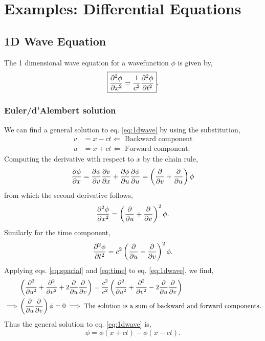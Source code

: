 \documentclass{book}
\begin{document}
\chapter{Examples: Differential Equations}
\section{1D Wave Equation}
The 1 dimensional wave equation for a wavefunction $\phi$ is given by,
\begin{equation}
	\boxed{\pdv[2]{\phi}{x} = \frac{1}{c^2}\pdv[2]{\phi}{t}}. \label{eq:1dwave}
\end{equation}
\subsection{Euler/d'Alembert solution}
We can find a general solution to eq. \eqref{eq:1dwave} by using the substitution,
\begin{align}
	v & = x - ct \Leftarrow \text{ Backward component}\label{eq:backward}\\
	u & = x + ct \Leftarrow \text{ Forward component}\label{eq:forward}.
\end{align}
Computing the derivative with respect to $x$ by the chain rule,
\begin{equation}
	\pdv{\phi}{x} = \pdv{\phi}{v}\pdv{v}{x} + \pdv{\phi}{u}\pdv{\phi}{u} = \left(\pdv{v} + \pdv{u}\right)\phi
\end{equation}
from which the second derivative follows,
\begin{equation}
	\pdv[2]{\phi}{x} = \left(\pdv{u}+\pdv{v}\right)^2\phi. \label{eq:spacial}
\end{equation}
Similarly for the time component,
\begin{equation}
	\pdv[2]{\phi}{t} = c^2\left(\pdv{u}-\pdv{v}\right)^2\phi. \label{eq:time}
\end{equation}
Applying eqs. \eqref{eq:spacial} and \eqref{eq:time} to eq. \eqref{eq:1dwave}, we find,
\begin{equation}
	\begin{split}
		& \left(\pdv[2]{u} + \pdv[2]{v} + 2\pdv{u}\pdv{v}\right) = \frac{c^2}{c^2}\left(\pdv[2]{u} + \pdv[2]{v} - 2\pdv{u}\pdv{v}\right) \\
		\implies & \left(\pdv{u}\pdv{v}\right)\phi = 0 \implies \text{The solution is a sum of backward and forward components.}
	\end{split}
\end{equation}
Thus the general solution to eq. \eqref{eq:1dwave} is,
\begin{equation}
	\boxed{\phi = \phi(x + ct) - \phi(x-ct)}.
\end{equation}
\end{document}

